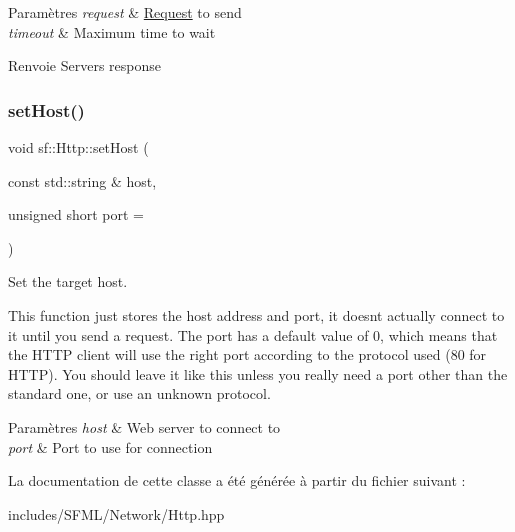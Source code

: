 \begin{DoxyParams}{Paramètres}
{\em request} & \hyperlink{classsf_1_1Http_1_1Request}{Request} to send \\
\hline
{\em timeout} & Maximum time to wait\\
\hline
\end{DoxyParams}
\begin{DoxyReturn}{Renvoie}
Server\textquotesingle{}s response 
\end{DoxyReturn}
\mbox{\label{classsf_1_1Http_a55121d543b61c41cf20b885a97b04e65}} 
\subsubsection{\texorpdfstring{set\+Host()}{setHost()}}
{\footnotesize\ttfamily void sf\+::\+Http\+::set\+Host (\begin{DoxyParamCaption}\item[{const std\+::string \&}]{host,  }\item[{unsigned short}]{port = {} }\end{DoxyParamCaption})}



Set the target host. 

This function just stores the host address and port, it doesn\textquotesingle{}t actually connect to it until you send a request. The port has a default value of 0, which means that the H\+T\+TP client will use the right port according to the protocol used (80 for H\+T\+TP). You should leave it like this unless you really need a port other than the standard one, or use an unknown protocol.


\begin{DoxyParams}{Paramètres}
{\em host} & Web server to connect to \\
\hline
{\em port} & Port to use for connection \\
\hline
\end{DoxyParams}


La documentation de cette classe a été générée à partir du fichier suivant \+:\begin{DoxyCompactItemize}
\item 
includes/\+S\+F\+M\+L/\+Network/Http.\+hpp\end{DoxyCompactItemize}
